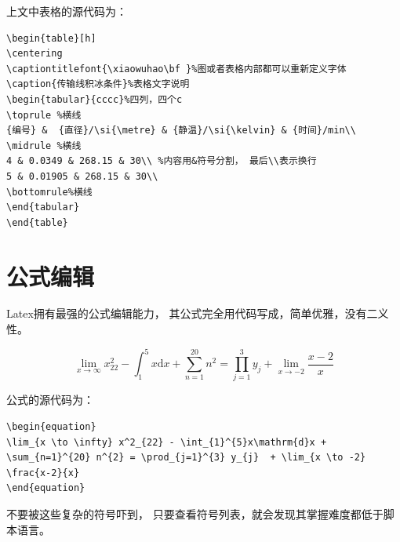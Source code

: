 \documentclass[a4paper, 10pt]{dselReport}
\begin{document}
上文中表格的源代码为：

\begin{lstlisting}
\begin{table}[h]
\centering
\captiontitlefont{\xiaowuhao\bf }%图或者表格内部都可以重新定义字体
\caption{传输线积冰条件}%表格文字说明
\begin{tabular}{cccc}%四列，四个c
\toprule %横线
{编号} &  {直径}/\si{\metre} & {静温}/\si{\kelvin} & {时间}/min\\
\midrule %横线
4 & 0.0349 & 268.15 & 30\\ %内容用&符号分割， 最后\\表示换行
5 & 0.01905 & 268.15 & 30\\
\bottomrule%横线
\end{tabular}
\end{table}
\end{lstlisting}

\section{公式编辑}
Latex拥有最强的公式编辑能力， 其公式完全用代码写成，简单优雅，没有二义性。

\begin{equation}
\lim_{x \to \infty} x^2_{22} - \int_{1}^{5}x\mathrm{d}x + \sum_{n=1}^{20} n^{2} = \prod_{j=1}^{3} y_{j}  + \lim_{x \to -2} \frac{x-2}{x}
\end{equation}


公式的源代码为：
\begin{lstlisting}
\begin{equation}
\lim_{x \to \infty} x^2_{22} - \int_{1}^{5}x\mathrm{d}x + \sum_{n=1}^{20} n^{2} = \prod_{j=1}^{3} y_{j}  + \lim_{x \to -2} \frac{x-2}{x}
\end{equation}
\end{lstlisting}

不要被这些复杂的符号吓到， 只要查看符号列表，就会发现其掌握难度都低于脚本语言。
\end{document}
